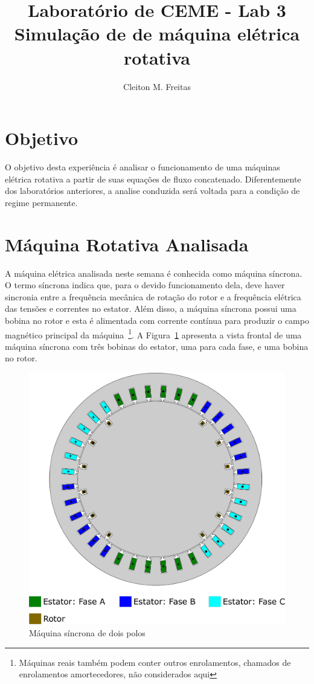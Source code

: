\documentclass[a4paper]{article}
\title{Laboratório de CEME - Lab 3\\Simulação de de máquina elétrica rotativa}
\author{Cleiton M. Freitas\\
}
\date{}
\theoremstyle{definition}
\theoremstyle{plain}
\begin{document}
\maketitle


\section{Objetivo}

O objetivo desta experiência é analisar o funcionamento de uma máquinas elétrica rotativa a partir de suas equações de fluxo concatenado. Diferentemente dos laboratórios anteriores, a analise conduzida será voltada para a condição de regime permanente.


\section{Máquina Rotativa Analisada}


A máquina elétrica analisada neste semana é conhecida como máquina síncrona. O termo síncrona indica que, para o devido funcionamento dela, deve haver sincronia entre a frequência mecânica de rotação do rotor e a frequência elétrica das tensões e correntes no estator. Além disso, a máquina síncrona possui uma bobina no rotor e esta é alimentada com corrente contínua para produzir o campo magnético principal da máquina~\footnote{Máquinas reais também podem conter outros enrolamentos, chamados de enrolamentos amortecedores, não considerados aqui}. A Figura~\ref{fig:maq} apresenta a vista frontal de uma máquina síncrona com três bobinas do estator, uma para cada fase, e uma bobina no rotor.     


\begin{figure}[H]
\centering
\includegraphics[width=0.75\linewidth]{./figuras/maq_2polos.pdf}
\caption{Máquina síncrona de dois polos}
\label{fig:maq}
\end{figure}
\end{document}
